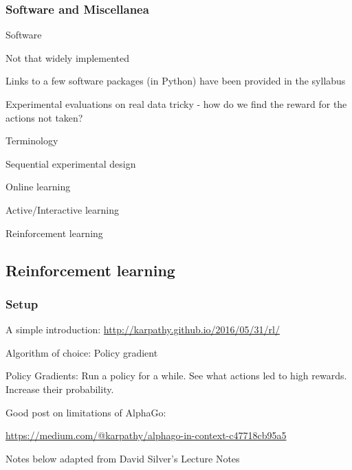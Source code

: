\documentclass[english]{article}
\begin{document}
\eenum

\subsubsection{Software and Miscellanea}

\benum

\item {Software}
\bitem
\item Not that widely implemented
\item Links to a few software packages (in Python) have been provided in the syllabus
\item Experimental evaluations on real data tricky -  how do we find the reward for the actions not taken?
\eitem



\item {Terminology}
\bitem
\item Sequential experimental design
\item Online learning
\item Active/Interactive learning
\item Reinforcement learning
\eitem



\eenum


\subsection{Reinforcement learning}
\subsubsection{Setup}
\benum
\item A simple introduction: 
\url{http://karpathy.github.io/2016/05/31/rl/}
\item Algorithm of choice: Policy gradient

Policy Gradients: Run a policy for a while. See what actions led to high rewards. Increase their probability.


\item Good post on limitations of AlphaGo: 

\url{https://medium.com/@karpathy/alphago-in-context-c47718cb95a5}


\item Notes below adapted from David Silver's Lecture Notes
\eenum 



\end{document}
